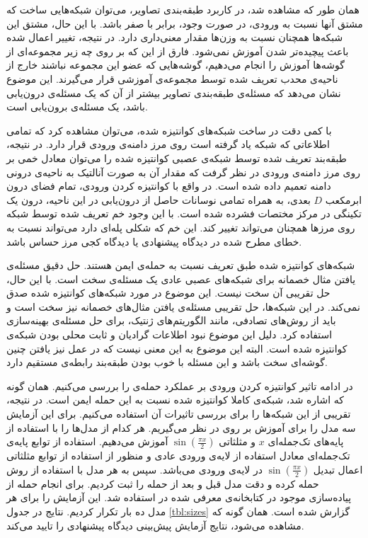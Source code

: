 \documentclass[12pt,onecolumn,a4paper]{article}
\begin{document}
همان طور که مشاهده شد، در کاربرد طبقه‌بندی تصاویر، می‌توان شبکه‌هایی ساخت که مشتق آنها نسبت به ورودی، در صورت وجود، برابر با صفر باشد. با این حال، مشتق این شبکه‌ها همچنان نسبت به وزن‌ها مقدار معنی‌داری دارد. در نتیجه، تغییر اعمال شده باعث پیچیده‌تر شدن آموزش نمی‌شود. فارق از این که بر روی چه زیر مجموعه‌ای از گوشه‌ها آموزش را انجام می‌دهیم، گوشه‌هایی که عضو این مجموعه نباشند خارج از ناحیه‌ی محدب تعریف شده توسط مجموعه‌ی آموزشی قرار می‌گیرند. این موضوع نشان می‌دهد که مسئله‌ی طبقه‌بندی تصاویر بیشتر از آن که یک مسئله‌ی درون‌یابی باشد، یک مسئله‌ی برون‌یابی است.

با کمی دقت در ساخت شبکه‌های کوانتیزه شده، می‌توان مشاهده کرد که تمامی اطلاعاتی که شبکه یاد گرفته است روی مرز دامنه‌ی ورودی قرار دارد. در نتیجه، طبقه‌بند تعریف شده توسط شبکه‌ی عصبی کوانتیزه شده را می‌توان معادل خمی بر روی مرز دامنه‌ی ورودی در نظر گرفت که مقدار آن به صورت آنالتیک به ناحیه‌ی درونی دامنه تعمیم داده شده است. در واقع با کوانتیزه کردن ورودی، تمام فضای درون ابرمکعب $D$ بعدی، به همراه تمامی نوسانات حاصل از درون‌یابی در این ناحیه، درون یک تکینگی در مرکز مختصات فشرده شده است. با این وجود خم تعریف شده توسط شبکه روی مرزها همچنان می‌تواند تغییر کند. این خم که شکلی پله‌ای دارد می‌تواند نسبت به خطای مطرح شده در دیدگاه پیشنهادی یا دیدگاه کجی مرز حساس باشد.

شبکه‌های کوانتیزه شده طبق تعریف نسبت به حمله‌ی  ایمن هستند. حل دقیق مسئله‌ی یافتن مثال خصمانه برای شبکه‌های عصبی عادی یک مسئله‌ی سخت است\cite{szegedy2013intriguing}. با این حال، حل تقریبی آن سخت نیست. این موضوع در مورد شبکه‌های کوانتیزه شده صدق نمی‌کند. در این شبکه‌ها، حل تقریبی مسئله‌ی یافتن مثال‌های خصمانه نیز سخت است و باید از روش‌های تصادفی، مانند الگوریتم‌های ژنتیک، برای حل مسئله‌ی بهینه‌سازی استفاده کرد. دلیل این موضوع نبود اطلاعات گرادیان و ثابت محلی بودن  شبکه‌ی کوانتیزه شده است. البته این موضوع به این معنی نیست که در عمل نیز یافتن چنین گوشه‌ای سخت باشد و این مسئله با خوب بودن طبقه‌بند رابطه‌ی مستقیم دارد.

در ادامه تاثیر کوانتیزه کردن ورودی بر عملکرد حمله‌ی  را بررسی می‌کنیم. همان گونه که اشاره شد، شبکه‌ی کاملا کوانتیزه شده نسبت به این حمله ایمن است. در نتیجه، تقریبی از این شبکه‌ها را برای بررسی تاثیرات آن استفاده می‌کنیم. برای این آزمایش سه مدل را برای آموزش بر روی
در نظر می‌گیریم. هر کدام از مدل‌ها را با استفاده از پایه‌های تک‌جمله‌ای $x$ و مثلثاتی $\sin(\frac{\pi x}{2})$ آموزش می‌دهیم. استفاده از توابع پایه‌ی تک‌جمله‌ای معادل استفاده از لایه‌ی ورودی عادی و منظور از استفاده از توابع مثلثاتی اعمال تبدیل $\sin(\frac{\pi x}{2})$ در لایه‌ی ورودی می‌باشد. سپس به هر مدل با استفاده از روش
حمله کرده و  دقت مدل قبل و بعد از حمله را ثبت کردیم. برای انجام حمله از پیاده‌سازی موجود در کتابخانه‌ی معرفی شده در 
\cite{papernot2018cleverhans}
استفاده شد. این آزمایش را برای هر مدل ده بار تکرار کردیم. نتایج در جدول
\ref{tbl:sizes}
گزارش شده است. همان گونه که مشاهده می‌شود، نتایج آزمایش پیش‌بینی دیدگاه پیشنهادی را تایید می‌کند.
\end{document}
